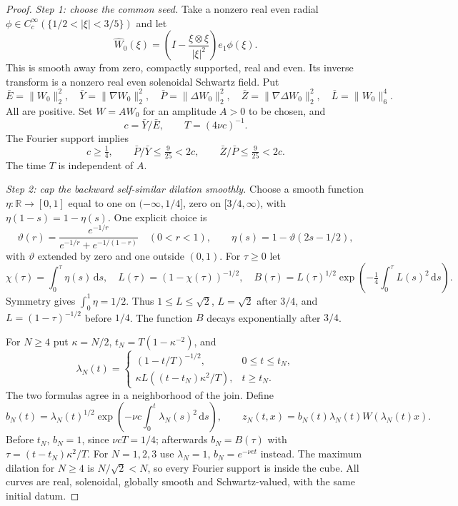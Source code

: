 \documentclass[11pt,a4paper]{article}
\theoremstyle{definition}\newtheorem{definition}[theorem]{Definition}
\theoremstyle{remark}\newtheorem{remark}[theorem]{Remark}
\newcommand{\R}{\mathbb R}
\newcommand{\dd}{\,\mathrm d}
\newcommand{\norm}[1]{\lVert #1\rVert}
\numberwithin{equation}{section}
\begin{document}
\begin{proof}
\emph{Step 1: choose the common seed.}
Take a nonzero real even radial $\phi\in C_c^\infty(\{1/2<|\xi|<3/5\})$ and let
\[
 \widehat W_0(\xi)=\left(I-\frac{\xi\otimes\xi}{|\xi|^2}\right)e_1\phi(\xi).
\]
This is smooth away from zero, compactly supported, real and even. Its inverse transform is a nonzero real even solenoidal Schwartz field. Put
\[
 \bar E=\norm{W_0}_2^2,\quad\bar Y=\norm{\nabla W_0}_2^2,
 \quad\bar P=\norm{\Delta W_0}_2^2,\quad
 \bar Z=\norm{\nabla\Delta W_0}_2^2,\quad \bar L=\norm{W_0}_6^4.
\]
All are positive. Set $W=AW_0$ for an amplitude $A>0$ to be chosen, and
\begin{equation}\label{eq:capT}
 c=\bar Y/\bar E,\qquad T=(4\nu c)^{-1}.
\end{equation}
The Fourier support implies
\begin{equation}\label{eq:capratios}
 c\ge\tfrac14,\qquad
 \bar P/\bar Y\le\tfrac9{25}<2c,\qquad
 \bar Z/\bar P\le\tfrac9{25}<2c.
\end{equation}
The time $T$ is independent of $A$.

\emph{Step 2: cap the backward self-similar dilation smoothly.}
Choose a smooth function $\eta:\R\to[0,1]$ equal to one on $(-\infty,1/4]$, zero on $[3/4,\infty)$, with $\eta(1-s)=1-\eta(s)$. One explicit choice is
\[
 \vartheta(r)=\frac{e^{-1/r}}{e^{-1/r}+e^{-1/(1-r)}}\quad(0<r<1),
 \qquad\eta(s)=1-\vartheta(2s-1/2),
\]
with $\vartheta$ extended by zero and one outside $(0,1)$. For $\tau\ge0$ let
\begin{equation}\label{eq:capshapes}
 \chi(\tau)=\int_0^\tau\eta(s)\dd s,\quad
 L(\tau)=(1-\chi(\tau))^{-1/2},\quad
 B(\tau)=L(\tau)^{1/2}\exp\left(-\tfrac14\int_0^\tau L(s)^2\dd s\right).
\end{equation}
Symmetry gives $\int_0^1\eta=1/2$. Thus $1\le L\le\sqrt2$, $L=\sqrt2$ after $3/4$, and $L=(1-\tau)^{-1/2}$ before $1/4$. The function $B$ decays exponentially after $3/4$.

For $N\ge4$ put $\kappa=N/2$, $t_N=T(1-\kappa^{-2})$, and
\begin{equation}\label{eq:caplambda}
 \lambda_N(t)=
 \begin{cases}
 (1-t/T)^{-1/2},&0\le t\le t_N,\\
 \kappa L((t-t_N)\kappa^2/T),&t\ge t_N.
 \end{cases}
\end{equation}
The two formulas agree in a neighborhood of the join. Define
\begin{equation}\label{eq:capcurve}
 b_N(t)=\lambda_N(t)^{1/2}
       \exp\left(-\nu c\int_0^t\lambda_N(s)^2\dd s\right),
 \qquad z_N(t,x)=b_N(t)\lambda_N(t)W(\lambda_N(t)x).
\end{equation}
Before $t_N$, $b_N=1$, since $\nu cT=1/4$; afterwards $b_N=B(\tau)$ with $\tau=(t-t_N)\kappa^2/T$. For $N=1,2,3$ use $\lambda_N=1$, $b_N=e^{-\nu ct}$ instead. The maximum dilation for $N\ge4$ is $N/\sqrt2<N$, so every Fourier support is inside the cube. All curves are real, solenoidal, globally smooth and Schwartz-valued, with the same initial datum.


\end{proof}
\end{document}
